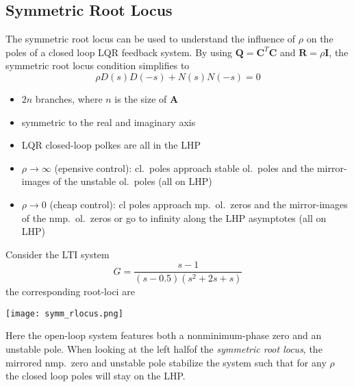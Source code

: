 \subsection{Symmetric Root Locus}
The symmetric root locus can be used to understand the influence of $\rho$ on the poles of a closed loop LQR feedback system.
By using $\mathbf{Q}=\mathbf{C}^T \mathbf{C}$ and $\mathbf{R}=\rho \mathbf{I}$, the symmetric root locus condition simplifies to
\noindent\begin{equation*}
    \rho D(s)D(-s)+N(s)N(-s)=0
\end{equation*}


\begin{itemize}
    \item $2n$ branches, where $n$ is the size of $\mathbf{A}$
    \item symmetric to the real and imaginary axis
    \item LQR closed-loop polkes are all in the LHP
    \item $\rho \rightarrow \infty$ (epensive control):\newline
          cl.\ poles approach stable ol.\ poles and the mirror-images of the unstable ol.\ poles (all on LHP)
    \item $\rho \rightarrow 0$ (cheap control):\newline
          cl poles approach mp.\ ol.\ zeros and the mirror-images of the nmp.\ ol.\ zeros or go to infinity along the LHP asymptotes (all on LHP)
\end{itemize}

\begin{examplesection}
    Consider the LTI system 
    \noindent\begin{equation*}
        G = \frac{s-1}{(s-0.5)(s^2+2s+s)}
    \end{equation*}
    the corresponding root-loci are
    \begin{center}
        \texttt{[image: symm\_rlocus.png]}
    \end{center}
    Here the open-loop system features both a nonminimum-phase zero and an unstable pole. 
    When looking at the left halfof the \textit{symmetric root locus}, the mirrored nmp.\ zero and unstable pole stabilize the system such that
    for any $\rho$ the closed loop poles will stay on the LHP.
\end{examplesection}